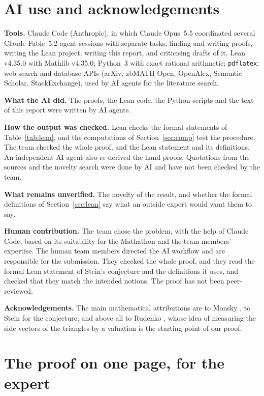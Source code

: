 \documentclass[11pt]{article}
\theoremstyle{definition}
\newcommand{\tL}[1]{\texttt{#1}}
\begin{document}
\section{AI use and acknowledgements}\label{sec:ai}

\textbf{Tools.} Claude Code (Anthropic), in which Claude Opus~5.5 coordinated several Claude
Fable~5.2 agent sessions with separate tasks: finding and writing proofs, writing the Lean project, writing this
report, and criticising drafts of it. Lean v4.35.0 with Mathlib v4.35.0; Python~3 with exact
rational arithmetic; \tL{pdflatex}; web search and database APIs (arXiv, zbMATH Open, OpenAlex, Semantic Scholar, StackExchange), used by AI agents for the literature search.

\textbf{What the AI did.} The proofs, the Lean code, the Python scripts and the text of this report
were written by AI agents.

\textbf{How the output was checked.} Lean checks the formal statements of Table~\ref{tab:lean}, and
the computations of Section~\ref{sec:comp} test the procedure. The team checked the whole proof,
and the Lean statement and its definitions. An independent AI agent also re-derived the hand
proofs. Quotations from the sources and the novelty search were done by AI and have not been
checked by the team.

\textbf{What remains unverified.} The novelty of the result, and whether the formal definitions of
Section~\ref{sec:lean} say what an outside expert would want them to say.

\textbf{Human contribution.}
The team chose the problem, with the help of Claude Code, based on its suitability for the
Mathathon and the team members' expertise. The human team members directed the AI workflow and are
responsible for the submission. They checked the whole proof, and they read the formal Lean statement of Stein's conjecture and the
definitions it uses, and checked that they match the intended notions. The proof has not been
peer-reviewed.

\textbf{Acknowledgements.} The main mathematical attributions are to Monsky \cite{Mon70,Mon90}, to Stein
\cite{Ste00} for the conjecture, and above all to Rudenko \cite{Rud}, whose idea of measuring the
side vectors of the triangles by a valuation is the starting point of our proof.

\appendix
\section{The proof on one page, for the expert}\label{sec:expert}
\end{document}
